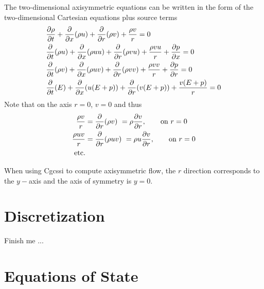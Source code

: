 \documentclass{article}
\begin{document}
The two-dimensional axisymmetric equations can be written in the form of the two-dimensional Cartesian equations plus source
terms
\begin{align}
 & {\partial \rho\over\partial t} + {\partial \over\partial x}( \rho u ) + {\partial \over\partial r}(\rho v ) 
            +   \frac{\rho v}{r}   = 0\\
 &  {\partial \over\partial t}(\rho u)  + {\partial \over\partial x}( \rho u u ) + {\partial \over\partial r}(\rho v u ) 
            +  \frac{\rho v u}{r}   + {\partial p \over\partial x} = 0 \\ 
 &  {\partial \over\partial t}(\rho v) + {\partial \over\partial x}( \rho u v ) + {\partial \over\partial r}(\rho v v ) 
           +  \frac{\rho v v}{r}    + {\partial p \over\partial r} = 0 \\ 
 &  {\partial\over\partial t}(E)  + {\partial \over\partial x}( u (E+p) ) + {\partial \over\partial r}(v (E+p) ) 
            +  \frac{v (E+p)}{r}    = 0
\end{align}
Note that on the axis $r=0$, $v=0$ and thus
\begin{align}
    \frac{\rho v}{r} &= {\partial \over\partial r}(\rho v ) ~= \rho {\partial v \over\partial r}, \qquad \text{on $r=0$} \\
    \frac{\rho u v}{r} &= {\partial \over\partial r}(\rho u v ) ~= \rho u {\partial v \over\partial r}, \qquad \text{on $r=0$} \\
     \text{etc.} & 
\end{align}

When using Cgcssi to compute axisymmetric flow, the $r$ direction corresponds to the $y-$axis and the axis of symmetry
is $y=0$. 

\section{ Discretization}

Finish me ...





\clearpage
\section{Equations of State}
\end{document}
